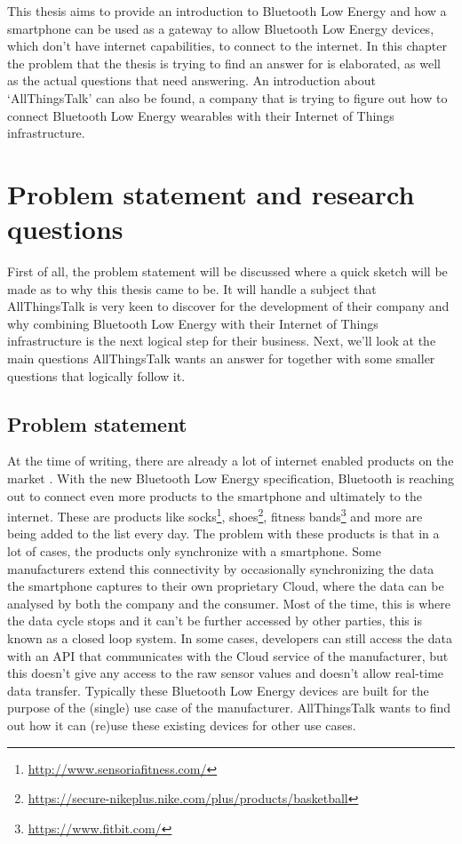 \documentclass[pdftex,a4paper,12pt,twoside]{report}
\begin{document}
This thesis aims to provide an introduction to Bluetooth Low Energy and how a smartphone can be used as a gateway to allow Bluetooth Low Energy devices, which don't have internet capabilities, to connect to the internet. In this chapter the problem that the thesis is trying to find an answer for is elaborated, as well as the actual questions that need answering. An introduction about `AllThingsTalk' can also be found, a company that is trying to figure out how to connect Bluetooth Low Energy wearables with their Internet of Things infrastructure.

\newpage{}
\section{Problem statement and research questions}
\label{sec:problemdefinition}
First of all, the problem statement will be discussed where a quick sketch will be made as to why this thesis came to be. It will handle a subject that AllThingsTalk is very keen to discover for the development of their company and why combining Bluetooth Low Energy with their Internet of Things infrastructure is the next logical step for their business. Next, we'll look at the main questions AllThingsTalk wants an answer for together with some smaller questions that logically follow it.

\subsection{Problem statement}
\label{subsec:problemstatement}
At the time of writing, there are already a lot of internet enabled products on the market \citep{gartner2015}. With the new Bluetooth Low Energy specification, Bluetooth is reaching out to connect even more products to the smartphone and ultimately to the internet. These are products like socks\footnote{\url{http://www.sensoriafitness.com/}}, shoes\footnote{\url{https://secure-nikeplus.nike.com/plus/products/basketball}}, fitness bands\footnote{\url{https://www.fitbit.com/}} and more are being added to the list every day. The problem with these products is that in a lot of cases, the products only synchronize with a smartphone. Some manufacturers extend this connectivity by occasionally synchronizing the data the smartphone captures to their own proprietary Cloud, where the data can be analysed by both the company and the consumer. Most of the time, this is where the data cycle stops and it can't be further accessed by other parties, this is known as a closed loop system. In some cases, developers can still access the data with an API that communicates with the Cloud service of the manufacturer, but this doesn't give any access to the raw sensor values and doesn't allow real-time data transfer. Typically these Bluetooth Low Energy devices are built for the purpose of the (single) use case of the manufacturer. AllThingsTalk wants to find out how it can (re)use these existing devices for other use cases.
\end{document}
